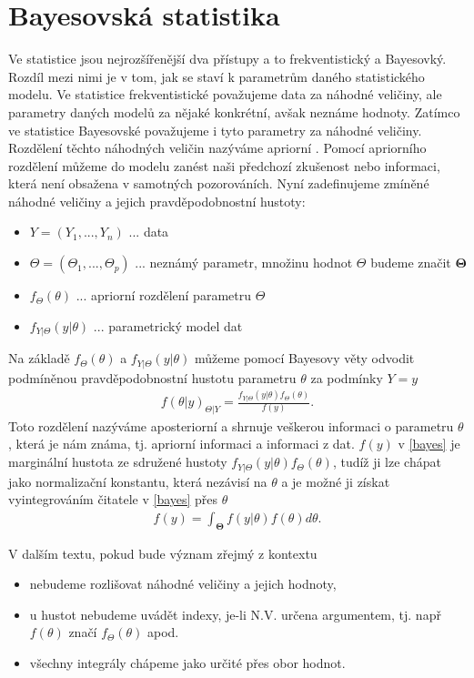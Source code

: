 \documentclass[czech,master,public,dept470,male,cpdeclaration,oneside, python]{diploma}
\begin{document}
\section{Bayesovská statistika}
Ve statistice jsou nejrozšířenější dva přístupy a to frekventistický a Bayesovký. Rozdíl mezi nimi je v tom, jak se staví k parametrům daného statistického modelu. Ve statistice frekventistické považujeme data za náhodné veličiny, ale parametry daných modelů za nějaké konkrétní, avšak neznáme hodnoty. Zatímco ve statistice Bayesovské považujeme i tyto parametry za náhodné veličiny. Rozdělení těchto náhodných veličin nazýváme apriorní \cite{robert2007bayesian}. Pomocí apriorního rozdělení můžeme do modelu zanést naši předchozí zkušenost nebo informaci, která není obsažena v samotných pozorováních. Nyní zadefinujeme zmíněné náhodné veličiny a jejich pravděpodobnostní hustoty:
\begin{itemize}
	\item $Y = ( Y_1, ..., Y_n)$ ... data
	\item $\Theta = (\Theta_1, ... ,\Theta_p)$ ... neznámý parametr, množinu hodnot $\Theta$ budeme značit $\boldsymbol{\Theta}$
	\item $f_{\Theta}(\theta)$ ... apriorní rozdělení parametru $\Theta$ 
	\item $f_{Y|\Theta}(y|\theta)$ ... parametrický model dat
\end{itemize}\par
Na základě $f_{\Theta}(\theta)$ a $f_{Y|\Theta}(y|\theta)$ můžeme pomocí Bayesovy věty odvodit podmíněnou pravděpodobnostní hustotu parametru $\theta$ za podmínky $Y=y$
\begin{align} \label{bayes}
f(\theta | y)_{\Theta|Y} = \frac{f_{Y|\Theta}(y|\theta)f_{\Theta}(\theta)}{f(y)}.
\end{align}
Toto rozdělení nazýváme aposteriorní a shrnuje veškerou informaci o parametru $\theta$, která je nám známa, tj. apriorní informaci a informaci z dat. $f(y)$ v \eqref{bayes} je marginální hustota ze sdružené hustoty $f_{Y|\Theta}(y|\theta)f_{\Theta}(\theta)$, tudíž ji lze chápat jako normalizační konstantu, která nezávisí na $\theta$ a je možné ji získat vyintegrováním čitatele v \eqref{bayes}  přes $\theta$
\begin{align}
f(y) = \int_{\boldsymbol{\Theta}} f(y|\theta)f(\theta) d\theta.
\end{align} \par
V dalším textu, pokud bude význam zřejmý z kontextu
\begin{itemize}
	\item nebudeme rozlišovat náhodné veličiny a jejich hodnoty,
	\item u hustot nebudeme uvádět indexy, je-li N.V. určena argumentem, tj. např $f(\theta)$ značí $f_{\Theta}(\theta)$ apod.
	\item všechny integrály chápeme jako určité přes obor hodnot.
\end{itemize}
\end{document}
